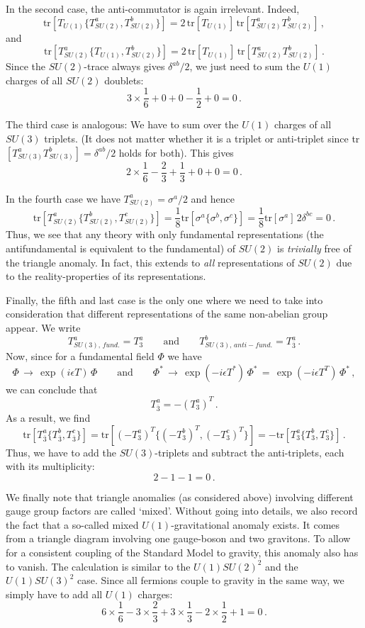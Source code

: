 \documentclass[12pt]{article}
\newcommand{\be}{\begin{equation}}
\newcommand{\ee}{\end{equation}}
\newcommand{\ol}{\overline}
\numberwithin{equation}{section}
\begin{document}
In the second case, the anti-commutator is again irrelevant. Indeed,
\be
\mbox{tr}[T_{U(1)}\{T^a_{SU(2)},T^b_{SU(2)}\}]=2\, \mbox{tr}[T_{U(1)}]\,\mbox{tr}[
T^a_{SU(2)}T^b_{SU(2)}]\,,
\ee
and
\be
\mbox{tr}[T^a_{SU(2)}\{T_{U(1)},T^b_{SU(2)}\}]= 2\, \mbox{tr}[T_{U(1)}]\,\mbox{tr}[
T^a_{SU(2)}T^b_{SU(2)}]\,.
\ee
Since the $SU(2)$-trace always gives $\delta^{ab}/2$, we just need to sum the $U(1)$ charges of all $SU(2)$ doublets:
\be
3\times\frac{1}{6}+0+0-\frac{1}{2}+0=0\,.
\ee

The third case is analogous: We have to sum over the $U(1)$ charges of all $SU(3)$ triplets. (It does not matter whether it is a triplet or anti-triplet since tr$[T^a_{SU(3)}T^b_{SU(3)}]=\delta^{ab}/2$ holds for both). This gives
\be
2\times\frac{1}{6}-\frac{2}{3}+\frac{1}{3}+0+0=0\,.
\ee

In the fourth case we have $T^a_{SU(2)}=\sigma^a/2$ and hence
\be
\mbox{tr}[T^a_{SU(2)}\{T^b_{SU(2)},T^c_{SU(2)}\}]=\frac{1}{8}
\mbox{tr}[\sigma^a\{\sigma^b,\sigma^c\}]=\frac{1}{8}\mbox{tr}[\sigma^a]\,2\delta^{bc}=0\,.
\ee
Thus, we see that any theory with only fundamental representations (the antifundamental is equivalent to the fundamental) of $SU(2)$ is {\it trivially} free of the triangle anomaly. In fact, this extends to {\it all} representations of $SU(2)$ due to the reality-properties of its representations. 

Finally, the fifth and last case is the only one where we need to take into consideration that different representations of the same non-abelian group appear. We write
\be
T^a_{SU(3),\,fund.}=T^a_3\qquad \mbox{and}\qquad T^b_{SU(3),\,anti-fund.}=T^a_{\ol{3}}\,.
\ee
Now, since for a fundamental field $\Phi$ we have
\be
\Phi\,\to\, \exp(i\epsilon T)\,\Phi\qquad\mbox{and}\qquad \Phi^*\,\to\, \exp(-i\epsilon T^*)\,\Phi^*\,=\,\exp(-i\epsilon T^T)\,\Phi^*\,,
\ee
we can conclude that
\be
T^a_{\ol{3}}=-(T^a_3)^T\,.
\ee
As a result, we find
\be
\mbox{tr}[T^a_{\ol{3}}\{T^b_{\ol{3}},T^c_{\ol{3}}\}]=
\mbox{tr}[(-T^a_3)^T\{(-T^b_3)^T,(-T^c_3)^T\}]= -\mbox{tr}[T^a_3\{T^b_3,T^c_3 \}] \,.
\ee
Thus, we have to add the $SU(3)$-triplets and subtract the anti-triplets, each with its multiplicity:
\be
2-1-1=0\,.
\ee

We finally note that triangle anomalies (as considered above) involving different gauge group factors are called `mixed'. Without going into details, we also record the fact that a so-called mixed $U(1)$-gravitational anomaly exists. It comes from a triangle diagram involving one gauge-boson and two gravitons. To allow for a consistent coupling of the Standard Model to gravity, this anomaly also has to vanish. The calculation is similar to the $U(1)SU(2)^2$ and the $U(1)SU(3)^2$ case. Since all fermions couple to gravity in the same way, we simply have to add all $U(1)$ charges:
\be
6\times\frac{1}{6}-3\times\frac{2}{3}+3\times\frac{1}{3}-2\times\frac{1}{2}+1=0\,.
\ee
\end{document}
